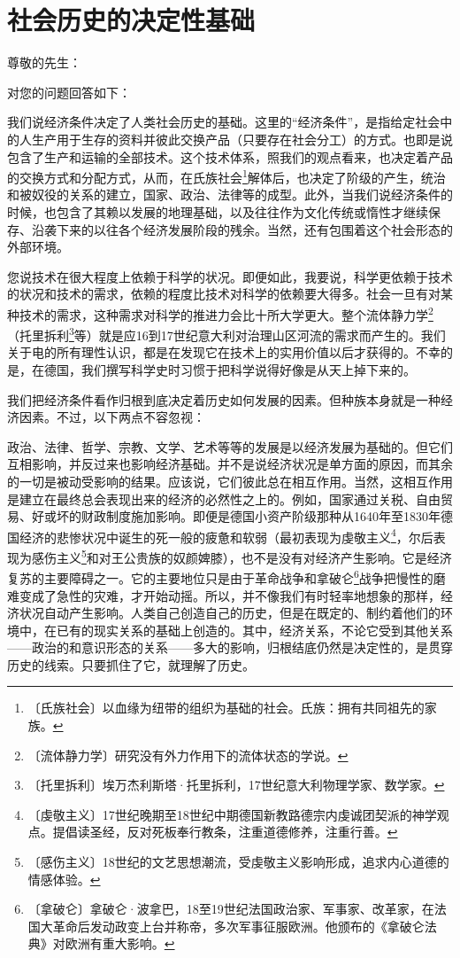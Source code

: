 \documentclass[12pt,UTF-8,openany]{ctexbook}
\begin{document}
\chapter{社会历史的决定性基础}

\begin{large}
    
    \noindent 尊敬的先生：
    
    \vspace{24pt}
    
    对您的问题回答如下：
    
    我们说经济条件决定了人类社会历史的基础。这里的“经济条件”，是指给定社会中的人生产用于生存的资料并彼此交换产品（只要存在社会分工）的方式。也即是说包含了生产和运输的全部技术。这个技术体系，照我们的观点看来，也决定着产品的交换方式和分配方式，从而，在氏族社会\footnote{〔氏族社会〕以血缘为纽带的组织为基础的社会。氏族：拥有共同祖先的家族。}解体后，也决定了阶级的产生，统治和被奴役的关系的建立，国家、政治、法律等的成型。此外，当我们说经济条件的时候，也包含了其赖以发展的地理基础，以及往往作为文化传统或惰性才继续保存、沿袭下来的以往各个经济发展阶段的残余。当然，还有包围着这个社会形态的外部环境。
    
    您说技术在很大程度上依赖于科学的状况。即便如此，我要说，科学更依赖于技术的状况和技术的需求，依赖的程度比技术对科学的依赖要大得多。社会一旦有对某种技术的需求，这种需求对科学的推进力会比十所大学更大。整个流体静力学\footnote{〔流体静力学〕研究没有外力作用下的流体状态的学说。}（托里拆利\footnote{〔托里拆利〕埃万杰利斯塔·托里拆利，17世纪意大利物理学家、数学家。}等）就是应16到17世纪意大利对治理山区河流的需求而产生的。我们关于电的所有理性认识，都是在发现它在技术上的实用价值以后才获得的。不幸的是，在德国，我们撰写科学史时习惯于把科学说得好像是从天上掉下来的。
    
    我们把经济条件看作归根到底决定着历史如何发展的因素。但种族本身就是一种经济因素。不过，以下两点不容忽视：
    
    政治、法律、哲学、宗教、文学、艺术等等的发展是以经济发展为基础的。但它们互相影响，并反过来也影响经济基础。并不是说经济状况是单方面的原因，而其余的一切是被动受影响的结果。应该说，它们彼此总在相互作用。当然，这相互作用是建立在最终总会表现出来的经济的必然性之上的。例如，国家通过关税、自由贸易、好或坏的财政制度施加影响。即便是德国小资产阶级那种从1640年至1830年德国经济的悲惨状况中诞生的死一般的疲惫和软弱（最初表现为虔敬主义\footnote{〔虔敬主义〕17世纪晚期至18世纪中期德国新教路德宗内虔诚团契派的神学观点。提倡读圣经，反对死板奉行教条，注重道德修养，注重行善。}，尔后表现为感伤主义\footnote{〔感伤主义〕18世纪的文艺思想潮流，受虔敬主义影响形成，追求内心道德的情感体验。}和对王公贵族的奴颜婢膝），也不是没有对经济产生影响。它是经济复苏的主要障碍之一。它的主要地位只是由于革命战争和拿破仑\footnote{〔拿破仑〕拿破仑·波拿巴，18至19世纪法国政治家、军事家、改革家，在法国大革命后发动政变上台并称帝，多次军事征服欧洲。他颁布的《拿破仑法典》对欧洲有重大影响。}战争把慢性的磨难变成了急性的灾难，才开始动摇。所以，并不像我们有时轻率地想象的那样，经济状况自动产生影响。人类自己创造自己的历史，但是在既定的、制约着他们的环境中，在已有的现实关系的基础上创造的。其中，经济关系，不论它受到其他关系——政治的和意识形态的关系——多大的影响，归根结底仍然是决定性的，是贯穿历史的线索。只要抓住了它，就理解了历史。
    

\end{large}
\end{document}
